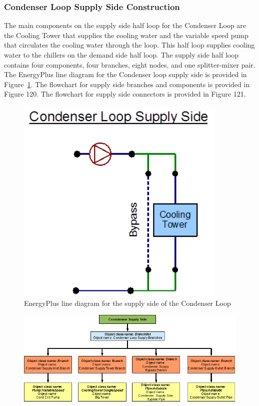 \subsubsection{Condenser Loop Supply Side Construction}\label{condenser-loop-supply-side-construction-000}

The main components on the supply side half loop for the Condenser Loop are the Cooling Tower that supplies the cooling water and the variable speed pump that circulates the cooling water through the loop. This half loop supplies cooling water to the chillers on the demand side half loop. The supply side half loop contains four components, four branches, eight nodes, and one splitter-mixer pair. The EnergyPlus line diagram for the Condenser loop supply side is provided in Figure~\ref{fig:energyplus-line-diagram-for-the-supply-side-002}. The flowchart for supply side branches and components is provided in Figure 120. The flowchart for supply side connectors is provided in Figure 121.

\begin{figure}[hbtp] %
\centering
\includegraphics[width=0.9\textwidth, height=0.9\textheight, keepaspectratio=true]{media/image119.png}
\caption{EnergyPlus line diagram for the supply side of the Condenser Loop \protect \label{fig:energyplus-line-diagram-for-the-supply-side-002}}
\end{figure}

\begin{figure}[htbp]
\centering
\includegraphics{media/image120.png}
\caption{}
\end{figure}

